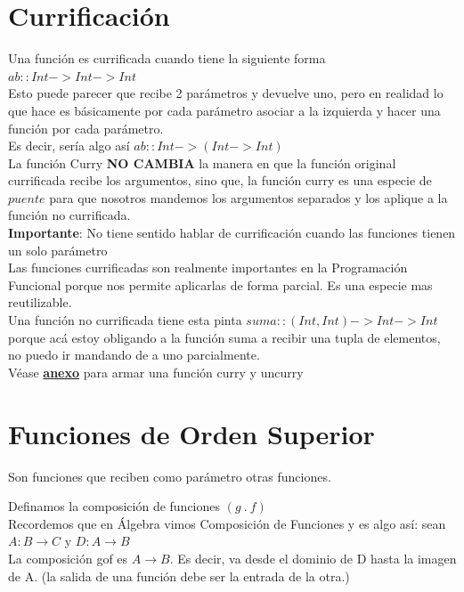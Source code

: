 \documentclass[10pt,a4paper]{article}
\begin{document}
\section*{Currificación}
Una función es currificada cuando tiene la siguiente forma $ ab :: Int -> Int -> Int $ \\
Esto puede parecer que recibe 2 parámetros y devuelve uno, pero en realidad lo que hace es básicamente por cada parámetro asociar a la izquierda y hacer una función por cada parámetro. \\
Es decir, sería algo así $ab::Int -> (Int -> Int)$ \\
La función Curry \textbf{NO CAMBIA} la manera en que la función original currificada recibe los argumentos, sino que, la función curry es una especie de $puente$ para que nosotros mandemos los argumentos separados y los aplique a la función no currificada. \\
\textbf{Importante}: No tiene sentido hablar de currificación cuando las funciones tienen un solo parámetro \\
Las funciones currificadas son realmente importantes en la Programación Funcional porque nos permite aplicarlas de forma parcial. Es una especie mas reutilizable. \\

Una función no currificada tiene esta pinta $suma::(Int, Int) -> Int -> Int$ porque acá estoy obligando a la función suma a recibir una tupla de elementos, no puedo ir mandando de a uno parcialmente. \\
Véase \hyperref[subsec:curry_uncurry]{\textbf{anexo}} para armar una función curry y uncurry
\section*{Funciones de Orden Superior}
Son funciones que reciben como parámetro otras funciones. 

Definamos la composición de funciones $(g \ .\ f)$ \\
Recordemos que en Álgebra vimos Composición de Funciones y es algo así: sean $A:B \rightarrow C$ y $D:A \rightarrow B$ \\

La composición gof es $A \rightarrow B$. Es decir, va desde el dominio de D hasta la imagen de A. (la salida de una función debe ser la entrada de la otra.) \\
\end{document}
